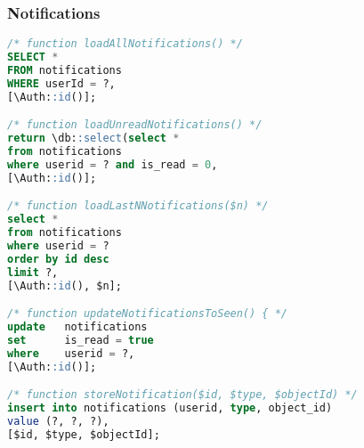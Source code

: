 \subsubsection{Notifications}
\begin{lstlisting}[language=sql]
/* function loadAllNotifications() */
SELECT *
FROM notifications
WHERE userId = ?,
[\Auth::id()];

/* function loadUnreadNotifications() */
return \db::select(select *
from notifications
where userid = ? and is_read = 0,
[\Auth::id()];

/* function loadLastNNotifications($n) */
select *
from notifications
where userid = ?
order by id desc
limit ?,
[\Auth::id(), $n];

/* function updateNotificationsToSeen() { */
update   notifications
set      is_read = true
where    userid = ?,
[\Auth::id()];

/* function storeNotification($id, $type, $objectId) */
insert into notifications (userid, type, object_id)
value (?, ?, ?),
[$id, $type, $objectId];

\end{lstlisting}
